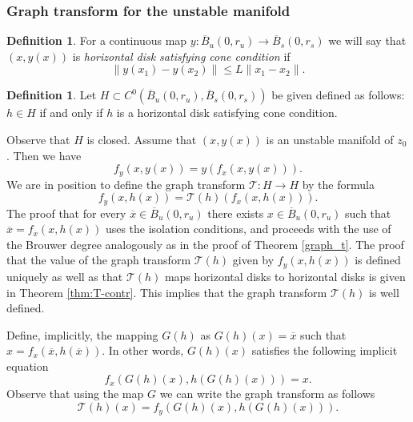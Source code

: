 \documentclass[11pt, leqno]{amsart}
\theoremstyle{definition}
\newtheorem{df}[thm]{Definition}
\begin{document}
\subsubsection{Graph transform for the unstable manifold}



\begin{df}
\label{def:hd-cc}
For a continuous map $y:\overline{B}_u(0,r_u) \to \overline{B}_s(0,r_s)$
we will say that $(x,y(x))$ is \emph{horizontal disk satisfying cone condition} if
\begin{equation}
  \|y(x_1)-y(x_2)\| \leq  L\|x_1-x_2\|. \label{eq:hordisk}
\end{equation}
\end{df}


\begin{df}
Let $H \subset C^{0}(\overline{B}_u(0,r_u),\overline{B}_s(0,r_s))$ be given defined as follows: $h \in H$ if and only if $h$ is a horizontal disk satisfying cone condition.
\end{df}
Observe that $H$ is closed. Assume that $(x,y(x))$ is an unstable manifold of $z_0$. Then we have
\begin{equation}
  f_y(x,y(x))=y(f_x(x,y(x))).
\end{equation}
We are in position to define the graph transform $\mathcal{T}:H\to H$ by the formula 
\begin{equation}
	f_y(x,h(x))=\mathcal{T}(h)(f_x(x,h(x))).
\end{equation}
The proof that for every $\overline{x}\in 
\overline{B}_u(0,r_u)$ there exists $x\in \overline{B}_u(0,r_u)$ such that $\overline{x} = f_x(x,h(x))$ uses the isolation conditions, and proceeds with the use of the Brouwer degree analogously as in the proof of Theorem \ref{graph_t}. The proof that the value of the graph transform $\mathcal{T}(h)$ given by $f_y(x,h(x))$ is defined uniquely as well as that  $\mathcal{T}(h)$ maps horizontal disks to horizontal disks is given in Theorem \ref{thm:T-contr}. This implies that the graph transform  $\mathcal{T}(h)$ is well defined. 

Define, implicitly, the mapping $G(h)$ as $G(h)(x) = \overline{x}$ such that $x = f_x(\overline{x},h(\overline{x}))$. In other words, $G(h)(x)$ satisfies the following implicit equation
\begin{equation}
	f_x(G(h)(x),h(G(h)(x)))=x.   \label{eq:impl-G}
\end{equation}
    Observe that using the map $G$  we can write the graph transform as follows
\begin{equation}
	\mathcal{T}(h) (x) = f_y(G(h)(x),h(G(h)(x))).  \label{eq:TG}
\end{equation}
\end{document}
